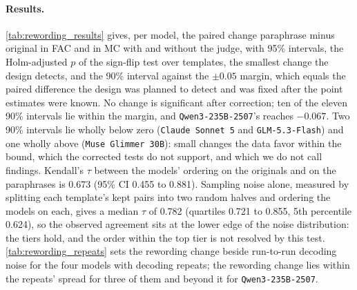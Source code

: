 \paragraph{Results.}
\autoref{tab:rewording_results} gives, per model, the paired change paraphrase minus original in FAC
and in MC with and without the judge, with 95\% intervals, the Holm-adjusted $p$ of the sign-flip
test over templates, the smallest change the design detects, and the 90\% interval against the
$\pm 0.05$ margin, which equals the paired difference the design was planned to detect and was fixed
after the point estimates were known.
No change is significant after correction; ten of the eleven 90\% intervals lie within the margin,
and \texttt{Qwen3-235B-2507}'s reaches $-0.067$.
Two 90\% intervals lie wholly below zero (\texttt{Claude Sonnet 5} and \texttt{GLM-5.3-Flash}) and
one wholly above (\texttt{Muse Glimmer 30B}): small changes the data favor within the bound, which
the corrected tests do not support, and which we do not call findings.
Kendall's $\tau$ between the models' ordering on the originals and on the paraphrases is 0.673 (95\%
CI 0.455 to 0.881).
Sampling noise alone, measured by splitting each template's kept pairs into two random halves and
ordering the models on each, gives a median $\tau$ of 0.782 (quartiles 0.721 to 0.855, 5th
percentile 0.624), so the observed agreement sits at the lower edge of the noise distribution: the
tiers hold, and the order within the top tier is not resolved by this test.
\autoref{tab:rewording_repeats} sets the rewording change beside run-to-run decoding noise for the
four models with decoding repeats; the rewording change lies within the repeats' spread for three of
them and beyond it for \texttt{Qwen3-235B-2507}.

